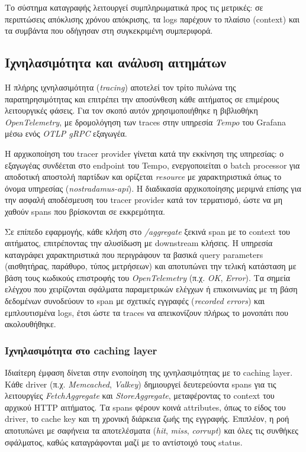 Το σύστημα καταγραφής λειτουργεί συμπληρωματικά προς τις μετρικές: σε
περιπτώσεις απόκλισης χρόνου απόκρισης, τα logs παρέχουν το πλαίσιο (context)
και τα συμβάντα που οδήγησαν στη συγκεκριμένη συμπεριφορά.

\subsection{Ιχνηλασιμότητα και ανάλυση αιτημάτων}

Η πλήρης ιχνηλασιμότητα (\textit{tracing}) αποτελεί τον τρίτο πυλώνα της
παρατηρησιμότητας και επιτρέπει την αποσύνθεση κάθε αιτήματος σε επιμέρους
λειτουργικές φάσεις. Για τον σκοπό αυτόν χρησιμοποιήθηκε η βιβλιοθήκη
\textit{OpenTelemetry}, με δρομολόγηση των traces στην υπηρεσία \textit{Tempo}
του Grafana μέσω ενός \textit{OTLP gRPC} εξαγωγέα.

Η αρχικοποίηση του tracer provider γίνεται κατά την εκκίνηση της υπηρεσίας: ο
εξαγωγέας συνδέεται στο endpoint του Tempo, ενεργοποιείται ο batch processor
για αποδοτική αποστολή παρτίδων και ορίζεται \textit{resource} με
χαρακτηριστικά όπως το όνομα υπηρεσίας (\textit{nostradamus-api}). Η διαδικασία
αρχικοποίησης μεριμνά επίσης για την ασφαλή αποδέσμευση του tracer provider
κατά τον τερματισμό, ώστε να μη χαθούν spans που βρίσκονται σε εκκρεμότητα.

Σε επίπεδο εφαρμογής, κάθε κλήση στο \textit{/aggregate} ξεκινά span με το
context του αιτήματος, επιτρέποντας την αλυσίδωση με downstream κλήσεις. Η
υπηρεσία καταγράφει χαρακτηριστικά που περιγράφουν τα βασικά query parameters
(αισθητήρας, παράθυρο, τύπος μετρήσεων) και αποτυπώνει την τελική κατάσταση με
βάση τους κωδικούς επιστροφής του \textit{OpenTelemetry} (π.χ. \textit{OK},
\textit{Error}). Τα σημεία ελέγχου που χειρίζονται σφάλματα παραμετρικών
ελέγχων ή επικοινωνίας με τη βάση δεδομένων συνοδεύουν το span με σχετικές
εγγραφές (\textit{recorded errors}) και εμπλουτισμένα logs, έτσι ώστε τα traces
να απεικονίζουν πλήρως το μονοπάτι που ακολουθήθηκε.

\subsubsection{Ιχνηλασιμότητα στο caching layer}

Ιδιαίτερη έμφαση δίνεται στην ενοποίηση της ιχνηλασιμότητας με το caching
layer. Κάθε driver (π.χ. \textit{Memcached}, \textit{Valkey}) δημιουργεί
δευτερεύοντα spans για τις λειτουργίες \textit{FetchAggregate} και
\textit{StoreAggregate}, μεταφέροντας το context του αρχικού HTTP αιτήματος. Τα
spans φέρουν κοινά attributes, όπως το είδος του driver, το cache key και τη
χρονική διάρκεια ζωής της εγγραφής. Επιπλέον, η ροή αποτυπώνει με σαφήνεια τα
αποτελέσματα (\textit{hit}, \textit{miss}, \textit{corrupt}) και όλες τις
συνθήκες σφάλματος, καθώς καταγράφονται μαζί με το αντίστοιχό τους status.

